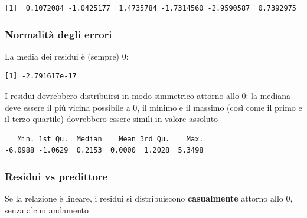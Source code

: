 \documentclass[
  a4paper,
  DIV=11,
  numbers=noendperiod]{scrreprt}
\newenvironment{Shaded}{\begin{snugshade}}{\end{snugshade}}
\newcommand{\AttributeTok}[1]{\textcolor[rgb]{0.13,0.29,0.53}{#1}}
\newcommand{\DecValTok}[1]{\textcolor[rgb]{0.00,0.00,0.81}{#1}}
\newcommand{\FunctionTok}[1]{\textcolor[rgb]{0.13,0.29,0.53}{\textbf{#1}}}
\newcommand{\NormalTok}[1]{#1}
\newcommand{\SpecialCharTok}[1]{\textcolor[rgb]{0.81,0.36,0.00}{\textbf{#1}}}
\newcommand{\StringTok}[1]{\textcolor[rgb]{0.31,0.60,0.02}{#1}}
\begin{document}
\begin{verbatim}
[1]  0.1072084 -1.0425177  1.4735784 -1.7314560 -2.9590587  0.7392975
\end{verbatim}

\subsubsection{Normalità degli errori}\label{normalituxe0-degli-errori}

La media dei residui è (sempre) 0:

\begin{Shaded}
\end{Shaded}

\begin{verbatim}
[1] -2.791617e-17
\end{verbatim}

I residui dovrebbero distribuirsi in modo simmetrico attorno allo 0: la
mediana deve essere il più vicina possibile a 0, il minimo e il massimo
(così come il primo e il terzo quartile) dovrebbero essere simili in
valore assoluto

\begin{Shaded}
\end{Shaded}

\begin{verbatim}
   Min. 1st Qu.  Median    Mean 3rd Qu.    Max. 
-6.0988 -1.0629  0.2153  0.0000  1.2028  5.3498 
\end{verbatim}

\subsubsection{Residui vs predittore}\label{residui-vs-predittore}

Se la relazione è lineare, i residui si distribuiscono
\textbf{casualmente} attorno allo 0, senza alcun andamento

\begin{Shaded}
\end{Shaded}
\end{document}

